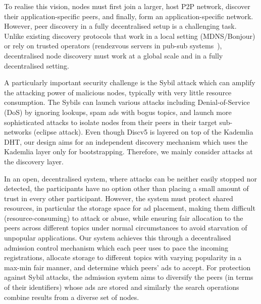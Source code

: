 To realise this vision, nodes must first join a larger, host P2P network, discover their application-specific peers, and finally, form an application-specific network. However, peer discovery in a fully decentralised setup is a challenging task. Unlike existing discovery protocols that work in a local setting (MDNS/Bonjour) or rely on trusted operators (\eg rendezvous servers in pub-sub systems~\cite{}), decentralised node discovery must work at a global scale and in a fully decentralised setting. 

A particularly important security challenge is the Sybil attack which can amplify the attacking power of malicious nodes, typically with very little resource consumption. The Sybils can launch various attacks including Denial-of-Service (DoS) by ignoring lookups, spam ads with bogus topics, and launch more sophisticated attacks to isolate nodes from their peers in their target sub-networks (\ie eclipse attack). Even though Discv5 is layered on top of the Kademlia DHT, our design aims for an independent discovery mechanism which uses the Kademlia layer only for bootstrapping. Therefore, we mainly consider attacks at the discovery layer.

In an open, decentralised system, where attacks can be neither easily stopped nor detected, the participants have no option other than placing a small amount of trust in every other participant. However, the system must protect shared resources, in particular the storage space for ad placement, making them difficult (\ie resource-consuming) to attack or abuse, while ensuring fair allocation to the peers across different topics under normal circumstances to avoid starvation of unpopular applications. Our system achieves this through a decentralised admission control mechanism which each peer uses to pace the incoming registrations, allocate storage to different topics with varying popularity in a max-min fair manner, and determine which peers' ads to accept. For protection against Sybil attacks, the admission system aims to diversify the peers (in terms of their identifiers) whose ads are stored and similarly the search operations combine results from a diverse set of nodes. 




